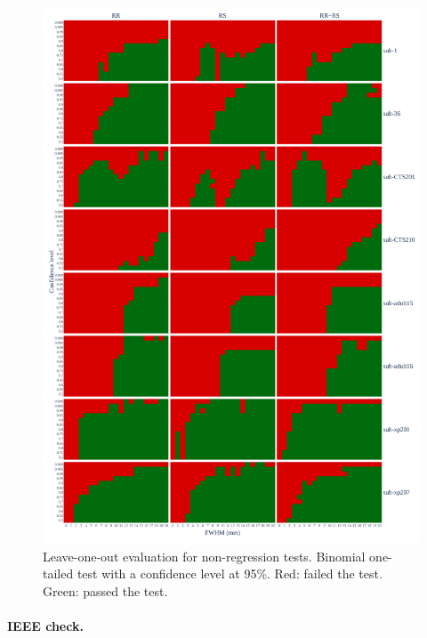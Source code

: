\documentclass{article}
\begin{document}
\begin{figure}
    \centering
    \includegraphics[width=\linewidth]{figures/exclude_mct_fwe_bonferroni.pdf}
    \caption{Leave-one-out evaluation for non-regression tests.
        Binomial one-tailed test with a confidence level at 95\%.
        Red: failed the test. Green: passed the test.}
    \label{fig:loo_bonferroni}
\end{figure}


\paragraph{IEEE check.}
\end{document}
